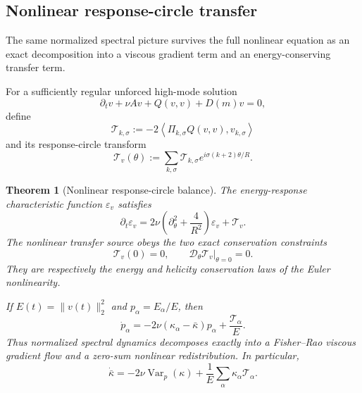 \documentclass[
 aps,
 prd,
 reprint,
 amsmath,
 amssymb,
 nofootinbib,
 superscriptaddress
]{revtex4-2}
\newtheorem{theorem}{Theorem}[section]
\theoremstyle{definition}
\theoremstyle{remark}
\begin{document}
\subsection{Nonlinear response-circle transfer}

The same normalized spectral picture survives the full nonlinear equation as
an exact decomposition into a viscous gradient term and an energy-conserving
transfer term.

For a sufficiently regular unforced high-mode solution
\begin{equation}
 \partial_t v+\nu Av+Q(v,v)+D(m)v=0,
 \label{N:eq:highmode}
\end{equation}
define
\begin{equation}
 \mathcal T_{k,\sigma}
 :=
 -2
 \left\langle
 \Pi_{k,\sigma}Q(v,v),
 v_{k,\sigma}
 \right\rangle
 \label{N:eq:shelltransfer}
\end{equation}
and its response-circle transform
\begin{equation}
 \mathcal T_v(\theta)
 :=
 \sum_{k,\sigma}
 \mathcal T_{k,\sigma}
 e^{i\sigma(k+2)\theta/R}.
 \label{N:eq:transfercircle}
\end{equation}

\begin{theorem}[Nonlinear response-circle balance]
\label{N:thm:nonlinearcircle}
The energy-response characteristic function
\(\varepsilon_v\) satisfies
\begin{equation}
 \boxed{
 \partial_t\varepsilon_v
 =
 2\nu
 \left(
 \partial_\theta^2+\frac4{R^2}
 \right)
 \varepsilon_v
 +
 \mathcal T_v.
 }
 \label{N:eq:nonlinearcircle}
\end{equation}
The nonlinear transfer source obeys the two exact conservation constraints
\begin{equation}
 \boxed{
 \mathcal T_v(0)=0,
 \qquad
 \left.
 \mathscr D_\theta\mathcal T_v
 \right|_{\theta=0}=0.
 }
 \label{N:eq:doublezero}
\end{equation}
They are respectively the energy and helicity conservation laws of the
Euler nonlinearity.

If
\(E(t)=\|v(t)\|_2^2\) and
\(p_\alpha=E_\alpha/E\), then
\begin{equation}
 \boxed{
 \dot p_\alpha
 =
 -2\nu(\kappa_\alpha-\bar\kappa)p_\alpha
 +
 \frac{\mathcal T_\alpha}{E}.
 }
 \label{N:eq:gradienttransfer}
\end{equation}
Thus normalized spectral dynamics decomposes exactly into a Fisher--Rao
viscous gradient flow and a zero-sum nonlinear redistribution.  In
particular,
\begin{equation}
 \boxed{
 \dot{\bar\kappa}
 =
 -2\nu\operatorname{Var}_{p}(\kappa)
 +
 \frac1E
 \sum_\alpha\kappa_\alpha\mathcal T_\alpha.
 }
 \label{N:eq:meanKnonlinear}
\end{equation}
\end{theorem}
\end{document}
